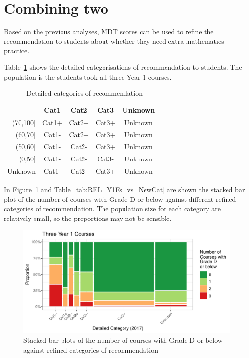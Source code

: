 \documentclass[a4paper]{report}
\begin{document}
\section{\label{sec:stackbar_binclf}Combining two}

Based on the previous analyses, MDT scores can be used to refine the recommendation to students about whether they need extra mathematics practice. 

Table~\ref{tab:REL_refine_all} shows the detailed categorisations of recommendation to students. The population is the students took all three Year 1 courses. 

\begin{table}[ht]
  \centering
  \begin{tabular}{r|ccccc}
    \hline
    & Cat1 & Cat2 & Cat3 & Unknown \\ 
   \hline
   (70,100] & Cat1+ & Cat2+ & Cat3+ & Unknown  \\ 
     (60,70] & Cat1- & Cat2+ & Cat3+ & Unknown  \\ 
     (50,60] & Cat1- & Cat2- & Cat3+ & Unknown  \\ 
     (0,50] & Cat1- & Cat2- & Cat3- & Unknown  \\ 
    Unknown & Cat1- & Cat2- & Cat3+ & Unknown \\
      \hline
  \end{tabular}
  \caption{\label{tab:REL_refine_all}Detailed categories of recommendation}
\end{table}

In Figure~\ref{fig:REL_Y1Fs_vs_NewCat_all} and Table~\ref{tab:REL_Y1Fs_vs_NewCat} are shown the stacked bar plot of the number of courses with Grade D or below against different refined categories of recommendation. The population size for each category are relatively small, so the proportions may not be sensible. 

\begin{figure}[H]
  \centering
  \includegraphics[width=\linewidth]{fig/REL_Y1Fs_vs_NewCat_all.pdf}
  \caption{\label{fig:REL_Y1Fs_vs_NewCat_all}Stacked bar plots of the number of courses with Grade D or below against refined categories of recommendation}
\end{figure}
\end{document}
